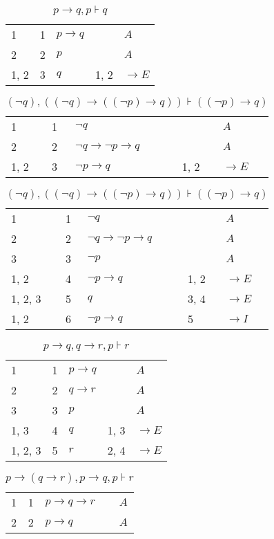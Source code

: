 \documentclass{article}
\begin{document}
\begin{table}[htbp]\caption*{$p→q,p ⊦ q$}\centering\begin{tabular}{lllll}
{1} & 1 & $p→q$ & {} & $A$ \\
{2} & 2 & $p$ & {} & $A$ \\
{1, 2} & 3 & $q$ & {1, 2} & $→E$ \\
\end{tabular}
\end{table}\begin{table}[htbp]\caption*{$(¬q),((¬q)→((¬p)→q)) ⊦ ((¬p)→q)$}\centering\begin{tabular}{lllll}
{1} & 1 & $¬q$ & {} & $A$ \\
{2} & 2 & $¬q→ ¬p→q$ & {} & $A$ \\
{1, 2} & 3 & $¬p→q$ & {1, 2} & $→E$ \\
\end{tabular}
\end{table}\begin{table}[htbp]\caption*{$(¬q),((¬q)→((¬p)→q)) ⊦ ((¬p)→q)$}\centering\begin{tabular}{lllll}
{1} & 1 & $¬q$ & {} & $A$ \\
{2} & 2 & $¬q→ ¬p→q$ & {} & $A$ \\
{3} & 3 & $¬p$ & {} & $A$ \\
{1, 2} & 4 & $¬p→q$ & {1, 2} & $→E$ \\
{1, 2, 3} & 5 & $q$ & {3, 4} & $→E$ \\
{1, 2} & 6 & $¬p→q$ & {5} & $→I$ \\
\end{tabular}
\end{table}\begin{table}[htbp]\caption*{$p→q,q→r,p ⊦ r$}\centering\begin{tabular}{lllll}
{1} & 1 & $p→q$ & {} & $A$ \\
{2} & 2 & $q→r$ & {} & $A$ \\
{3} & 3 & $p$ & {} & $A$ \\
{1, 3} & 4 & $q$ & {1, 3} & $→E$ \\
{1, 2, 3} & 5 & $r$ & {2, 4} & $→E$ \\
\end{tabular}
\end{table}\begin{table}[htbp]\caption*{$p→(q→r),p→q,p ⊦ r$}\centering\begin{tabular}{lllll}
{1} & 1 & $p→q→r$ & {} & $A$ \\
{2} & 2 & $p→q$ & {} & $A$ \\

\end{tabular}
\end{table}
\end{document}
